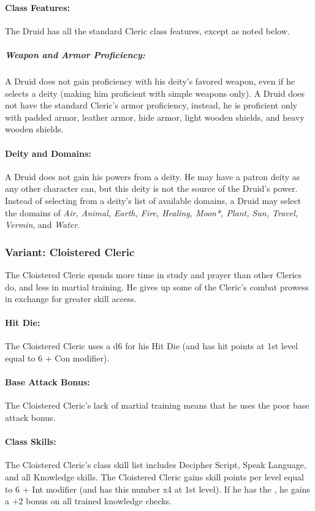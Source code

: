 \paragraph{Class Features:}
The Druid has all the standard Cleric class features, except as noted below.
\subparagraph{Weapon and Armor Proficiency:} A Druid does not gain proficiency with his deity's favored weapon, even if he selects a deity (making him proficient with simple weapons only).
A Druid does not have the standard Cleric's armor proficiency, instead, he is proficient only with padded armor, leather armor, hide armor, light wooden shields, and heavy wooden shields.

\paragraph{Deity and Domains:} A Druid does not gain his powers from a deity. 
He may have a patron deity as any other character can, but this deity is not the source of the Druid's power.
Instead of selecting from a deity's list of available domains, a Druid may select the domains of \emph{Air, Animal, Earth, Fire, Healing, Moon*, Plant, Sun, Travel, Vermin}, and \emph{Water}.

\subsubsection{Variant: Cloistered Cleric}
The Cloistered Cleric spends more time in study and prayer than other Clerics do, and less in martial training. 
He gives up some of the Cleric's combat prowess in exchange for greater skill access.

\paragraph{Hit Die:}
The Cloistered Cleric uses a d6 for his Hit Die (and has hit points at 1st level equal to 6 + Con modifier).

\paragraph{Base Attack Bonus:}
The Cloistered Cleric's lack of martial training means that he uses the poor base attack bonus.

\paragraph{Class Skills:}
The Cloistered Cleric's class skill list includes Decipher Script, Speak Language, and all Knowledge skills. The Cloistered Cleric gains skill points per level equal to 6 + Int modifier (and has this number x4 at 1st level). If he has the , he gains a +2 bonus on all trained knowledge checks.

